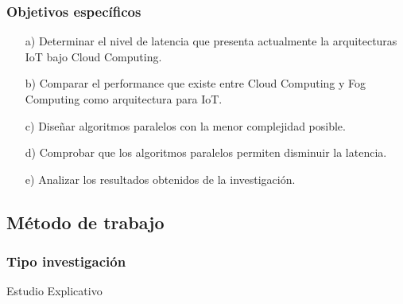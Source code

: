         \subsubsection{Objetivos específicos}
            \begin{enumerate}
                \item[a)] Determinar el nivel de latencia que presenta actualmente la arquitecturas IoT bajo Cloud Computing.
                \item[b)] Comparar el performance que existe entre Cloud Computing y Fog Computing como arquitectura para IoT. 
                \item[c)] Diseñar algoritmos  paralelos con la menor complejidad posible.
                \item[d)] Comprobar que los algoritmos paralelos permiten disminuir la latencia.
                \item[e)] Analizar los resultados obtenidos de la investigación.
            \end{enumerate}
    \subsection{Método de trabajo}    
            \subsubsection{Tipo investigación}
                Estudio Explicativo
